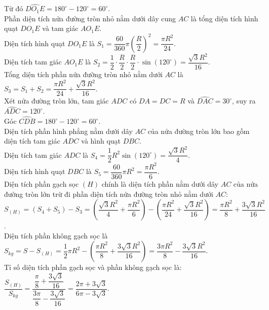 \begin{ex}
{Từ đó $\widehat{DO_1E} = 180^\circ - 120^\circ = 60^\circ$.\\
Phần diện tích nửa đường tròn nhỏ nằm dưới dây cung $AC$ là tổng diện tích hình quạt $DO_1E$ và tam giác $AO_1E$.\\
Diện tích hình quạt $DO_1E$ là $S_1 = \dfrac{60}{360} \pi \left(\dfrac{R}{2}\right)^2 = \dfrac{\pi R^2}{24}$.\\
Diện tích tam giác $AO_1E$ là $S_2 = \dfrac{1}{2} \cdot \dfrac{R}{2} \cdot \dfrac{R}{2} \cdot \sin\left(120^\circ\right) = \dfrac{\sqrt{3} R^2}{16}$.\\
Tổng diện tích phần nửa đường tròn nhỏ nằm dưới $AC$ là $S_3 = S_1 + S_2 = \dfrac{\pi R^2}{24} + \dfrac{\sqrt{3} R^2}{16}$.\\
Xét nửa đường tròn lớn, tam giác $ADC$ có $DA = DC = R$ và $\widehat{DAC} = 30^\circ$, suy ra $\widehat{ADC} = 120^\circ$.\\
Góc $\widehat{CDB} = 180^\circ - 120^\circ = 60^\circ$.\\
Diện tích phần hình phẳng nằm dưới dây $AC$ của nửa đường tròn lớn bao gồm diện tích tam giác $ADC$ và hình quạt $DBC$.\\
Diện tích tam giác $ADC$ là $S_4 = \dfrac{1}{2} R^2 \sin\left(120^\circ\right) = \dfrac{\sqrt{3} R^2}{4}$.\\
Diện tích hình quạt $DBC$ là $S_5 = \dfrac{60}{360} \pi R^2 = \dfrac{\pi R^2}{6}$.\\
Diện tích phần gạch sọc $(H)$ chính là diện tích phần nằm dưới dây $AC$ của nửa đường tròn lớn trừ đi phần diện tích nửa đường tròn nhỏ nằm dưới $AC$:\\
$S_{(H)} = \left(S_4 + S_5\right) - S_3 = \left( \dfrac{\sqrt{3} R^2}{4} + \dfrac{\pi R^2}{6} \right) - \left( \dfrac{\pi R^2}{24} + \dfrac{\sqrt{3} R^2}{16} \right) = \dfrac{\pi R^2}{8} + \dfrac{3\sqrt{3} R^2}{16}$.\\
Diện tích phần không gạch sọc là $S_{kg} = S - S_{(H)} = \dfrac{1}{2} \pi R^2 - \left( \dfrac{\pi R^2}{8} + \dfrac{3\sqrt{3} R^2}{16} \right) = \dfrac{3\pi R^2}{8} - \dfrac{3\sqrt{3} R^2}{16}$.\\
Tỉ số diện tích phần gạch sọc và phần không gạch sọc là:\\
$\dfrac{S_{(H)}}{S_{kg}} = \dfrac{\dfrac{\pi}{8} + \dfrac{3\sqrt{3}}{16}}{\dfrac{3\pi}{8} - \dfrac{3\sqrt{3}}{16}} = \dfrac{2\pi + 3\sqrt{3}}{6\pi - 3\sqrt{3}}$.
}
\end{ex}

